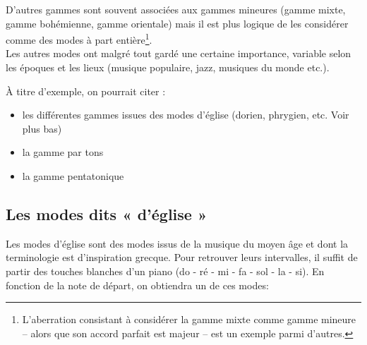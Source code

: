 \documentclass[11pt]{scrreprt}
\begin{document}
\begin{center}
\end{center}

D'autres gammes sont souvent associées aux gammes mineures (gamme mixte, gamme bohémienne, gamme  orientale) mais il est plus logique de les considérer comme des modes à part entière\footnote{L'aberration consistant à considérer la gamme mixte comme gamme mineure -- alors que son accord parfait est majeur -- est un exemple parmi d'autres.}.\\

Les autres modes ont malgré tout gardé une certaine importance, variable selon les époques et les lieux (musique populaire, jazz, musiques du monde etc.).

À titre d'exemple, on pourrait citer :
\begin{itemize}
\item les différentes gammes issues des modes d'église (dorien, phrygien, etc. Voir plus bas)
\item la gamme par tons
\item la gamme pentatonique
\end{itemize}

\subsection{Les modes dits « d'église »}
Les modes d'église sont des modes issus de la musique du moyen âge et dont la terminologie est d'inspiration grecque. Pour retrouver leurs intervalles, il suffit de partir des touches blanches d'un piano (do - ré - mi - fa - sol - la - si). En fonction de la note de départ, on obtiendra un de ces modes:
\end{document}

